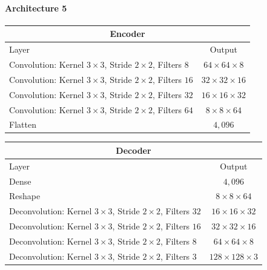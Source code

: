 \paragraph{Architecture 5}

\begin{center}
    \begin{table}[H]
        \centering
        \begin{tabular}{ | l | c | }
            \multicolumn{2}{c}{Encoder} \\ \hline
            Layer & Output\\ \hline
            Convolution: Kernel $3\times3$, Stride $2\times2$, Filters $8  $    & $64\times 64\times 8  $    \\  
            Convolution: Kernel $3\times3$, Stride $2\times2$, Filters $16 $    & $32\times 32\times 16 $    \\
            Convolution: Kernel $3\times3$, Stride $2\times2$, Filters $32 $    & $16\times 16\times 32 $    \\
            Convolution: Kernel $3\times3$, Stride $2\times2$, Filters $64 $    & $8\times 8\times   64 $    \\
            Flatten                                                             & $4,096$                    \\
            \hline
        \end{tabular} 
    \end{table}
\end{center}
\vspace{-4em}
\begin{center}
    \begin{table}[H]
        \centering
        \begin{tabular}{ | l | c | }
            \multicolumn{2}{c}{Decoder} \\ \hline
            Layer & Output\\ \hline
            Dense                                                                   & $4,096$                   \\
            Reshape                                                                 & $8\times 8\times    64 $  \\
            Deconvolution: Kernel $3\times3$, Stride $2\times2$, Filters $32 $      & $16\times 16\times  32 $  \\
            Deconvolution: Kernel $3\times3$, Stride $2\times2$, Filters $16 $      & $32\times 32\times  16 $  \\
            Deconvolution: Kernel $3\times3$, Stride $2\times2$, Filters $8  $      & $64\times 64\times  8  $  \\
            Deconvolution: Kernel $3\times3$, Stride $2\times2$, Filters $3  $      & $128\times 128\times3  $  \\
            \hline
        \end{tabular} 
    \end{table}
\end{center}

